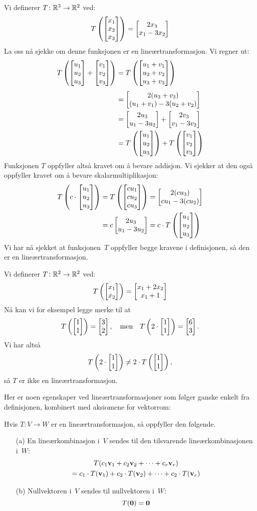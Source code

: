 \begin{ex}
Vi definerer $T \colon \mathbb{R}^3 \to \mathbb{R}^2$ ved:
\[
T\left( \begin{bmatrix} x_1 \\ x_2 \\ x_3 \end{bmatrix} \right) = \begin{bmatrix} 2x_3 \\ x_1-3x_2 \end{bmatrix}
\]
La oss nå sjekke om denne funksjonen er en lineærtransformasjon.  Vi
regner ut:
\begin{align*}
T\left( \begin{bmatrix} u_1 \\ u_2 \\ u_3 \end{bmatrix} + \begin{bmatrix} v_1 \\ v_2 \\ v_3 \end{bmatrix} \right)
&= T\left( \begin{bmatrix} u_1 + v_1 \\ u_2 + v_2 \\ u_3 + v_3 \end{bmatrix} \right) \\[4pt]
&= \begin{bmatrix} 2(u_3 + v_3) \\ (u_1 + v_1) - 3(u_2 + v_2) \end{bmatrix} \\
&= \begin{bmatrix} 2u_3 \\ u_1-3u_2 \end{bmatrix} + \begin{bmatrix} 2v_3 \\ v_1-3v_2 \end{bmatrix} \\
&= T\left( \begin{bmatrix} u_1 \\ u_2 \\ u_3 \end{bmatrix} \right) + T\left( \begin{bmatrix} v_1 \\ v_2 \\ v_3 \end{bmatrix} \right)
\end{align*}
Funksjonen $T$ oppfyller altså kravet om å bevare addisjon.  Vi
sjekker at den også oppfyller kravet om å bevare skalarmultiplikasjon:
\begin{align*}
T\left( c \cdot \begin{bmatrix} u_1 \\ u_2 \\ u_3 \end{bmatrix} \right)
&= T\left( \begin{bmatrix} c u_1 \\ c u_2 \\ c u_3 \end{bmatrix} \right)
 = \begin{bmatrix} 2(c u_3) \\ c u_1 - 3(c u_2) \end{bmatrix}\\
&= c \begin{bmatrix} 2 u_3 \\ u_1 - 3 u_2 \end{bmatrix}
 = c \cdot T\left( \begin{bmatrix} u_1 \\ u_2 \\ u_3 \end{bmatrix} \right)
\end{align*}
Vi har nå sjekket at funksjonen~$T$ oppfyller begge kravene i
definisjonen, så den er en lineærtransformasjon.
\end{ex}

\begin{ex}
Vi definerer $T \colon \mathbb{R}^2 \to \mathbb{R}^2$ ved:
\[
T\left( \begin{bmatrix} x_1 \\ x_2 \end{bmatrix} \right) = \begin{bmatrix} x_1 + 2 x_2 \\ x_1 + 1 \end{bmatrix}
\]
Nå kan vi for eksempel legge merke til at
\[
T\left( \begin{bmatrix} 1 \\ 1 \end{bmatrix} \right) = \begin{bmatrix} 3 \\ 2 \end{bmatrix},
\quad\text{men}\quad
T\left( 2 \cdot \begin{bmatrix} 1 \\ 1 \end{bmatrix} \right) = \begin{bmatrix} 6 \\ 3 \end{bmatrix}.
\]
Vi har altså
\[
T\left( 2 \cdot \begin{bmatrix} 1 \\ 1 \end{bmatrix} \right) \ne 2 \cdot T\left( \begin{bmatrix} 1 \\ 1 \end{bmatrix} \right),
\]
så $T$ er ikke en lineærtransformasjon.
\end{ex}

Her er noen egenskaper ved lineærtransformasjoner som følger ganske
enkelt fra definisjonen, kombinert med aksiomene for vektorrom:

\begin{thm}
\label{thm:lin-tr-lin-komb}
Hvis $T \colon V \to W$ er en lineærtransformasjon, så oppfyller den
følgende.
\begin{enumerate}
\item[(a)] En lineærkombinasjon i~$V$ sendes til den tilsvarende
lineærkombinasjonen i~$W$:
\begin{multline*}
T( c_1 \mathbf{v}_1 + c_2 \mathbf{v}_2 + \cdots + c_r \mathbf{v}_r )
\\
= c_1 \cdot T(\mathbf{v}_1) + c_2 \cdot T(\mathbf{v}_2) + \cdots + c_2 \cdot T(\mathbf{v}_r)
\end{multline*}
\item[(b)] Nullvektoren i~$V$ sendes til nullvektoren i~$W$:
\[
T(\mathbf{0}) = \mathbf{0}
\]
\end{enumerate}
\end{thm}

